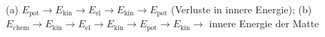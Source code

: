 (a) $E_\mathrm{pot} \to E_\mathrm{kin} \to E_\mathrm{el} \to E_\mathrm{kin} \to E_\mathrm{pot}$ (Verluste in innere Energie); (b) $E_\mathrm{chem} \to E_\mathrm{kin} \to E_\mathrm{el} \to E_\mathrm{kin} \to E_\mathrm{pot} \to E_\mathrm{kin} \to$ innere Energie der Matte
